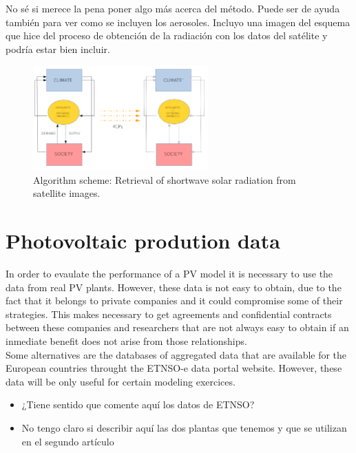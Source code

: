 {\color{red} No sé si merece la pena poner algo más acerca del método. Puede ser de ayuda también para ver como se incluyen los aerosoles. Incluyo una imagen del esquema que hice del proceso de obtención de la radiación con los datos del satélite y podría estar bien incluir.}\\


\begin{figure}
  \centering
  \includegraphics[width=0.6\textwidth]{figs/esquema}
  \caption{Algorithm scheme: Retrieval of shortwave solar radiation from satellite images.}
 \label{fig:algorithm}
\end{figure}

\section{Photovoltaic prodution data}

In order to evaulate the performance of a PV model it is necessary to use the data from real PV plants. However, these data is not easy to obtain, due to the fact that it belongs to private companies and it could compromise some of their strategies. This makes necessary to get agreements and confidential contracts between these companies and researchers that are not always easy to obtain if an inmediate benefit does not arise from those relationships.\\

Some alternatives are the databases of aggregated data that are available for the European countries throught the ETNSO-e data portal website. However, these data will be only useful for certain modeling exercices.\\

\begin{itemize}
\item {\color{red} ¿Tiene sentido que comente aquí los datos de ETNSO?}
\item {\color{red}No tengo claro si describir aquí las dos plantas que tenemos y que se utilizan en el segundo artículo}\\
\end{itemize}

